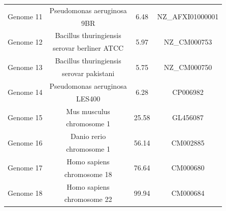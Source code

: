 \documentclass[preprint,12pt]{elsarticle}
\begin{document}
\begin{table}[!thpb]
\begin{tabular}{c  c  c c}
\multirow{2}{*}{Genome 11}&Pseudomonas aeruginosa& \multirow{2}{*}{6.48} &\multirow{2}{*}{NZ\_AFXI01000001}\\    &9BR&\\
\hline
    
\multirow{2}{*}{Genome 12}&Bacillus thuringiensis&  \multirow{2}{*}{5.97} &\multirow{2}{*}{ NZ\_CM000753}\\    &serovar berliner ATCC &\\
\hline
    
\multirow{2}{*}{Genome 13}&Bacillus thuringiensis& \multirow{2}{*}{5.75} &\multirow{2}{*}{ NZ\_CM000750 }\\    &serovar pakistani&\\
\hline
    
\multirow{2}{*}{Genome 14}&Pseudomonas aeruginosa& \multirow{2}{*}{6.28} &\multirow{2}{*}{CP006982}\\    &LES400&\\
\hline

\multirow{2}{*}{Genome 15}& Mus musculus & \multirow{2}{*}{25.58} &\multirow{2}{*}{GL456087}\\  &chromosome 1&\\
\hline

\multirow{2}{*}{Genome 16}& Danio rerio & \multirow{2}{*}{56.14} &\multirow{2}{*}{CM002885}\\ & chromosome 1 &\\
\hline
\multirow{2}{*}{Genome 17}&Homo sapiens & \multirow{2}{*}{76.64 } &\multirow{2}{*}{  CM000680  }\\    & chromosome 18 &\\
\hline
\multirow{2}{*}{Genome 18}&Homo sapiens & \multirow{2}{*}{99.94} &\multirow{2}{*}{CM000684   }\\ & chromosome 22&\\
\hline
\end{tabular}
\end{table} 
\end{document}
